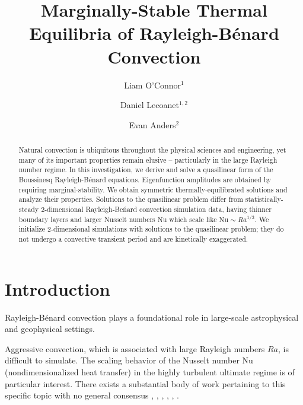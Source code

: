 \documentclass[reprint,amsmath,amssymb,aps]{revtex4-1}
\newcommand\Nu{\mathrm{Nu}}
\begin{document}
\title{Marginally-Stable Thermal Equilibria of Rayleigh-Bénard Convection}

\author{Liam O'Connor$^1$}
\author{Daniel Lecoanet$^{1, 2}$}
\author{Evan Anders$^2$}

\begin{abstract}
Natural convection is ubiquitous throughout the physical sciences and engineering, yet many of its important properties remain elusive -- particularly in the large Rayleigh number regime.
In this investigation, we derive and solve a quasilinear form of the Boussinesq Rayleigh-B\'enard equations. 
Eigenfunction amplitudes are obtained by requiring marginal-stability. We obtain symmetric thermally-equilibrated solutions and analyze their properties. 
Solutions to the quasilinear problem differ from statistically-steady 2-dimensional Rayleigh-Be\'nard convection simulation data, having thinner boundary layers and larger Nusselt numbers $\Nu$ which scale like $\Nu \sim Ra^{1/3}$. 
We initialize 2-dimensional simulations with solutions to the quasilinear problem; they do not undergo a convective transient period and are kinetically exaggerated.
\end{abstract}


\maketitle

\section{Introduction}
Rayleigh-B\'enard convection plays a foundational role in large-scale astrophysical and geophysical settings.

Aggressive convection, which is associated with large Rayleigh numbers $Ra$, is difficult to simulate. 
The scaling behavior of the Nusselt number $\Nu$ (nondimensionalized heat transfer) in the highly turbulent ultimate regime is of particular interest.
There exists a substantial body of work pertaining to this specific topic with no general consensus \cite{Malkus}, \cite{Kraichnan} \cite{Spiegel}, \cite{Castaing}, \cite{Grossman}, \cite{Ahlers}, \cite{Malkus}. 
\end{document}
